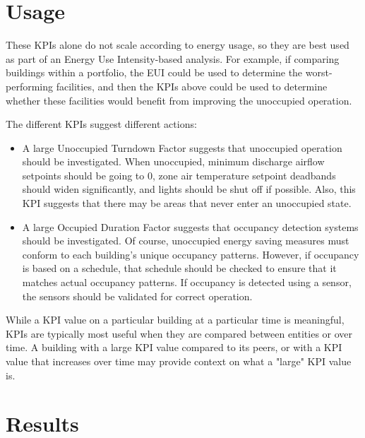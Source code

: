 \documentclass[a4paper]{article}
\begin{document}
\section{Usage}

These KPIs alone do not scale according to energy usage, so they are best used as part of an Energy Use Intensity-based analysis. For example, if comparing buildings within a portfolio, the EUI could be used to determine the worst-performing facilities, and then the KPIs above could be used to determine whether these facilities would benefit from improving the unoccupied operation.

The different KPIs suggest different actions:
\begin{itemize}
\item{A large Unoccupied Turndown Factor suggests that unoccupied operation should be investigated. When unoccupied, minimum discharge airflow setpoints should be going to 0, zone air temperature setpoint deadbands should widen significantly, and lights should be shut off if possible. Also, this KPI suggests that there may be areas that never enter an unoccupied state.}
\item{A large Occupied Duration Factor suggests that occupancy detection systems should be investigated. Of course, unoccupied energy saving measures must conform to each building's unique occupancy patterns. However, if occupancy is based on a schedule, that schedule should be checked to ensure that it matches actual occupancy patterns. If occupancy is detected using a sensor, the sensors should be validated for correct operation.}
\end{itemize}

While a KPI value on a particular building at a particular time is meaningful, KPIs are typically most useful when they are compared between entities or over time. A building with a large KPI value compared to its peers, or with a KPI value that increases over time may provide context on what a "large" KPI value is.

\section{Results}
\end{document}
